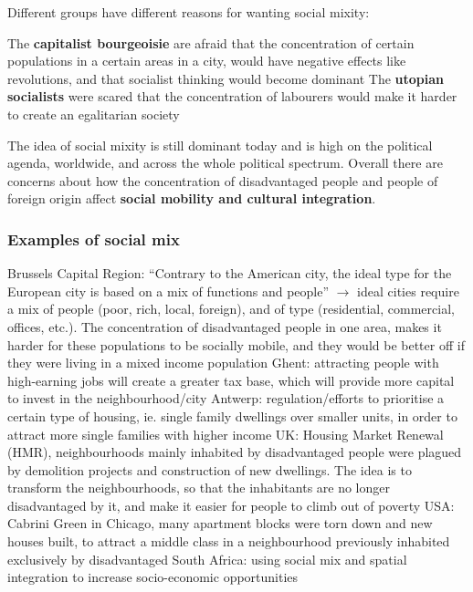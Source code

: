 \documentclass{article}
\begin{document}
Different groups have different reasons for wanting social mixity: 

\begin{outline}
	\1 The \textbf{capitalist bourgeoisie} are afraid that the concentration of certain populations in a certain areas in a city, would have negative effects like revolutions, and that socialist thinking would become dominant
	\1 The \textbf{utopian socialists} were scared that the concentration of labourers would make it harder to create an egalitarian society
\end{outline}

The idea of social mixity is still dominant today and is high on the political agenda, worldwide, and across the whole political spectrum. Overall there are concerns about how the concentration of disadvantaged people and people of foreign origin affect \textbf{social mobility and cultural integration}.

\subsubsection{Examples of social mix}

\begin{outline}
	\1  Brussels Capital Region: ``Contrary to the American city, the ideal type for the European city is based on a mix of functions and people'' $\rightarrow$ ideal cities require a mix of people (poor, rich, local, foreign), and of type (residential, commercial, offices, etc.). The concentration of disadvantaged people in one area, makes it harder for these populations to be socially mobile, and they would be better off if they were living in a mixed income population
	\1 Ghent: attracting people with high-earning jobs will create a greater tax base, which will provide more capital to invest in the neighbourhood/city
	\1 Antwerp: regulation/efforts to prioritise a certain type of housing, ie. single family dwellings over smaller units, in order to attract more single families with higher income
	\1 UK: Housing Market Renewal (HMR), neighbourhoods mainly inhabited by disadvantaged people were plagued by demolition projects and construction of new dwellings. The idea is to transform the neighbourhoods, so that the inhabitants are no longer disadvantaged by it, and make it easier for people to climb out of poverty
	\1 USA: Cabrini Green in Chicago, many apartment blocks were torn down and new houses built, to attract a middle class in a neighbourhood previously inhabited exclusively by disadvantaged
	\1 South Africa: using social mix and spatial integration to increase socio-economic opportunities
\end{outline}
\end{document}
